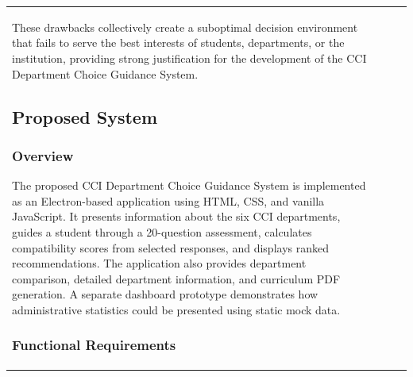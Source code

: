 \documentclass[12pt, a4paper]{article}
\begin{document}
\begin{itemize}[leftmargin=1.5em, itemsep=3pt]
\begin{table}[H]
\begin{tabularx}{\textwidth}{>{\raggedright\arraybackslash}p{0.8cm}>{\raggedright\arraybackslash}p{3.5cm}>{\raggedright\arraybackslash}X>{\raggedright\arraybackslash}p{2.5cm}}
These drawbacks collectively create a suboptimal decision environment that fails to serve the best interests of students, departments, or the institution, providing strong justification for the development of the CCI Department Choice Guidance System.

\clearpage

\newpage
\subsection{Proposed System}

\subsubsection{Overview}

The proposed CCI Department Choice Guidance System is implemented as an Electron-based application using HTML, CSS, and vanilla JavaScript. It presents information about the six CCI departments, guides a student through a 20-question assessment, calculates compatibility scores from selected responses, and displays ranked recommendations. The application also provides department comparison, detailed department information, and curriculum PDF generation. A separate dashboard prototype demonstrates how administrative statistics could be presented using static mock data.

\subsubsection*{Functional Requirements}


\end{tabularx}
\end{table}
\end{itemize}
\end{document}
